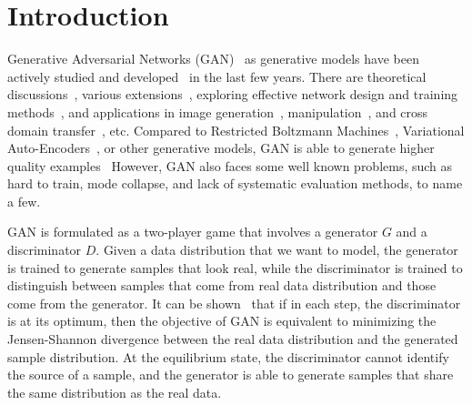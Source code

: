 \section{Introduction} \label{sec:intro}

Generative Adversarial Networks (GAN)~\cite{goodfellow2014generative}
as generative models have been actively studied
and developed~\cite{chen2016infogan,nowozin2016f,
arjovsky2017wasserstein,zhao2016energy,radford2015unsupervised,
mescheder2017adversarial,mirza2014conditional,
odena2016conditional,denton2015deep,
huang2016stacked,zhang2016stackgan,kim2017learning,zhu2017unpaired,
che2016mode,donahue2016adversarial,salimans2016improved,zhu2016generative}
in the last few years.
There are theoretical discussions~\cite{arjovsky2017wasserstein,
zhao2016energy,nowozin2016f},
various extensions~\cite{chen2016infogan,che2016mode,donahue2016adversarial,
salimans2016improved,mescheder2017adversarial,mirza2014conditional,
huang2016stacked},
exploring effective network design and
training methods~\cite{radford2015unsupervised,arjovsky2017towards},
and applications in image generation~\cite{odena2016conditional,denton2015deep,
zhang2016stackgan},
manipulation~\cite{zhu2016generative,perarnau2016invertible},
and cross domain transfer~\cite{kim2017learning,zhu2017unpaired},
etc.
Compared to Restricted Boltzmann Machines~\cite{hinton2002training},
Variational Auto-Encoders~\cite{kingma2013auto},
or other generative models,
GAN is able to generate higher quality examples~\cite{ledig2016photo}
However,
GAN also faces some well known problems,
such as hard to train,
mode collapse,
and lack of systematic evaluation methods,
to name a few.

GAN is formulated as a two-player game that involves a generator $G$ and
a discriminator $D$.
Given a data distribution that we want to model,
the generator is trained to generate samples that look real,
while the discriminator is trained to distinguish between
samples that come from real data distribution and
those come from the generator.
It can be shown~\cite{goodfellow2014generative} that if in each step,
the discriminator is at its optimum,
then the objective of GAN
is equivalent to minimizing the Jensen-Shannon divergence between
the real data distribution and the generated sample distribution.
At the equilibrium state,
the discriminator cannot identify the source of a sample,
and the generator is able to generate samples that share the same
distribution as the real data.

